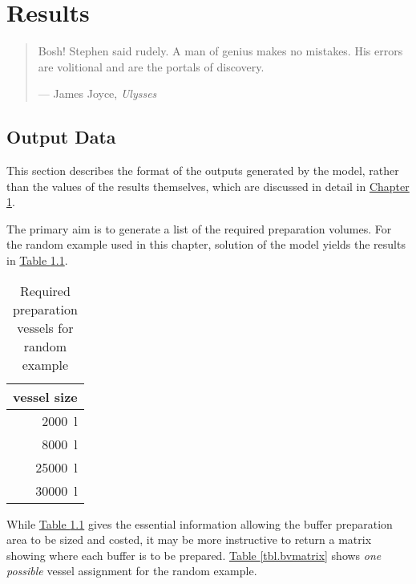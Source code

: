 %
%
%
%

\chapter{Results}\label{C.results}

\begin{quote}
Bosh! Stephen said rudely.
A man of genius makes no mistakes.
His errors are volitional and are the portals of discovery.

\hspace{2cm}--- James Joyce, \emph{Ulysses}
\end{quote}

\section{Output Data}\label{S.outputdata}

This section describes the format of the outputs generated by the model, rather
than the values of the results themselves, which are discussed in detail in 
\hyperref[C.results]{Chapter \ref*{C.results}}.

The primary aim is to generate a list of the required preparation volumes.
For the random example used in this chapter, solution of the model yields
the results in \hyperref[tbl.reqvessels]{Table \ref*{tbl.reqvessels}}.

\begin{table}[h!]
    \centering
    \caption{Required preparation vessels for random example}
    \label{tbl.reqvessels}
    \begin{tabular}{r}
        vessel size\\ \hline
        \SI{2000}{\litre}\\
        \SI{8000}{\litre}\\
        \SI{25000}{\litre}\\
        \SI{30000}{\litre}\\
    \end{tabular}
\end{table}

While \hyperref[tbl.reqvessels]{Table \ref*{tbl.reqvessels}} gives the
essential information allowing the buffer preparation area to be sized and
costed, it may be more instructive to return a matrix showing where each buffer
is to be prepared. 
\hyperref[tbl.bvmatrix]{Table \ref*{tbl.bvmatrix}} shows \emph{one possible}
vessel assignment for the random example.

